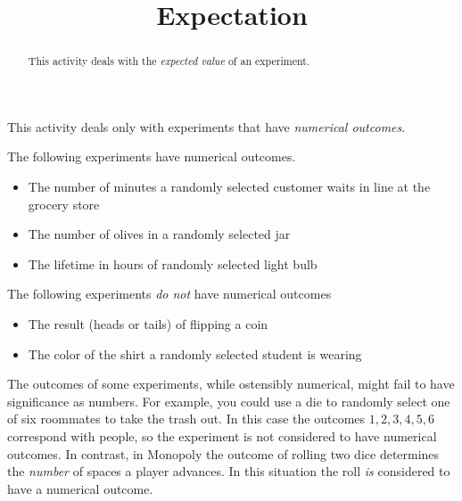 \documentclass[number]{ximera}
\title{Expectation}
\begin{document}
\begin{abstract}
This activity deals with the {\em expected value}
of an experiment.
\end{abstract}
\maketitle

This activity deals only with experiments
that have {\em numerical outcomes}.

\begin{example}
The following experiments have numerical outcomes.
\begin{itemize}
\item The number of minutes a randomly selected
customer waits in line at the grocery store
\item The number of olives in a randomly selected jar
\item The lifetime in hours of randomly selected light bulb
\end{itemize}
\end{example}

\begin{example}
The following experiments {\em do not} have numerical outcomes
\begin{itemize}
\item The result (heads or tails) of flipping a coin
\item The color of the shirt a randomly selected student is wearing
\end{itemize}
\end{example}

\begin{remark}
The outcomes of some experiments, while ostensibly numerical,
might fail to have significance as numbers.
For example, you could use a die to randomly select one of
six roommates to take the trash out.
In this case the outcomes $1,2,3,4,5,6$ correspond with people,
so the experiment is not considered to have numerical outcomes.
In contrast, in Monopoly the outcome of rolling two dice
determines the {\em number} of spaces a player advances.
In this situation the roll {\em is} considered to have a numerical outcome.
\end{remark}
\end{document}
